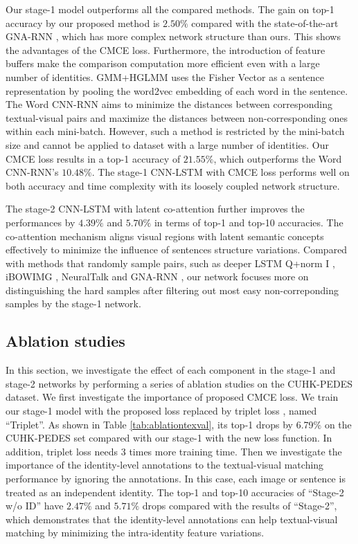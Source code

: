 Our stage-1 model outperforms all the compared methods. The gain on top-1 accuracy by our proposed method is $2.50\%$ compared with the state-of-the-art GNA-RNN \cite{li2017person},
which has more complex network structure than ours. This shows the advantages of the CMCE loss.
Furthermore, the introduction of feature buffers make the comparison computation more efficient even with a large number of identities.
GMM+HGLMM \cite{klein2015associating} uses the Fisher Vector as a sentence representation by pooling the word2vec embedding of each word in the sentence.
The Word CNN-RNN \cite{reed2016learning} aims to minimize the distances between corresponding textual-visual pairs and maximize the distances between non-corresponding ones within each mini-batch. However, such a method is restricted by the mini-batch size and cannot be applied to dataset with a large number of identities. Our CMCE loss results in a top-1 accuracy of $21.55\%$, which outperforms the Word CNN-RNN's $10.48\%$.
The stage-1 CNN-LSTM with CMCE loss performs well on both accuracy and time complexity with its loosely coupled network structure.

The stage-2 CNN-LSTM with latent co-attention further improves the performances by $4.39\%$ and $5.70\%$ in terms of top-1 and top-10 accuracies.
The co-attention mechanism aligns visual regions with latent semantic concepts effectively to minimize the influence of sentences structure variations.
Compared with methods that randomly sample pairs, such as deeper LSTM Q+norm I \cite{Antol_2015_ICCV}, iBOWIMG \cite{zhou2015simple}, NeuralTalk \cite{vinyals2015show} and GNA-RNN \cite{li2017person}, our network focuses more on distinguishing the hard samples after filtering out most easy non-correponding samples by the stage-1 network.


\subsection{Ablation studies}
In this section, we investigate the effect of each component in the stage-1 and stage-2 networks by performing a series of ablation studies on the CUHK-­PEDES dataset.
We first investigate the importance of proposed CMCE loss.
We train our stage-1 model with the proposed loss replaced by triplet loss \cite{reed2016learning}, named ``Triplet''. As shown in Table \ref{tab:ablationtexval}, its top-1 drops by 6.79$\%$ on the CUHK-PEDES set compared with our stage-1 with the new loss function. In addition, triplet loss \cite{reed2016learning} needs 3 times more training time.
Then we investigate the importance of the identity-level annotations to the textual-visual matching performance by ignoring the annotations. In this case, each image or sentence is treated as an independent identity. The top-1 and top-10 accuracies of ``Stage-2 w/o ID'' have $2.47\%$ and $5.71\%$ drops compared with the results of ``Stage-2'', which demonstrates that the identity-level annotations can help textual-visual matching by minimizing the intra-identity feature variations.

